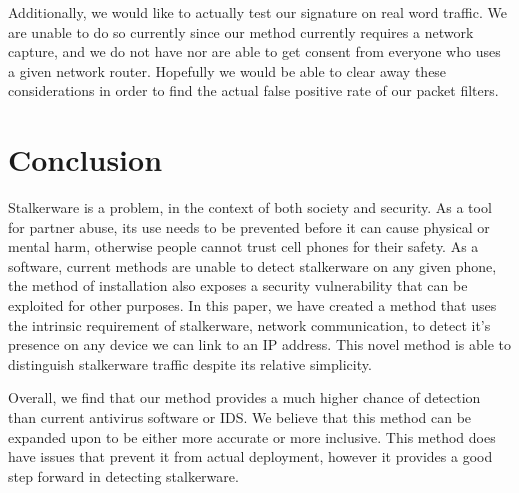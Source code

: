 \documentclass[acmtog]{acmart}
\begin{document}
Additionally, we would like to actually test our signature on real word traffic. We are unable to do so currently since our method currently requires a network capture, and we do not have nor are able to get consent from everyone who uses a given network router. Hopefully we would be able to clear away these considerations in order to find the actual false positive rate of our packet filters.

\section{Conclusion}

Stalkerware is a problem, in the context of both society and security. As a tool for partner abuse, its use needs to be prevented before it can cause physical or mental harm, otherwise people cannot trust cell phones for their safety. As a software, current methods are unable to detect stalkerware on any given phone, the method of installation also exposes a security vulnerability that can be exploited for other purposes. In this paper, we have created a method that uses the intrinsic requirement of stalkerware, network communication, to detect it's presence on any device we can link to an IP address. This novel method is able to distinguish stalkerware traffic despite its relative simplicity.

Overall, we find that our method provides a much higher chance of detection than current antivirus software or IDS. We believe that this method can be expanded upon to be either more accurate or more inclusive. This method does have issues that prevent it from actual deployment, however it provides a good step forward in detecting stalkerware.



\end{document}
